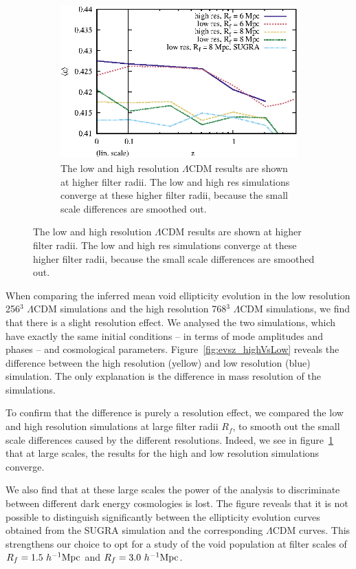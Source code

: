 \begin{figure}
\begin{subfigure}[t]{0.49\textwidth}
    \includegraphics[width=\textwidth]{ch_voidsde/img/filter_radius_convergence}
    \caption{The low and high resolution $\Lambda$CDM results are shown at higher filter radii. The low and high res simulations converge at these higher filter radii, because the small scale differences are smoothed out.}
    \label{fig:filter_radius_convergence}
  \end{subfigure}
\label{fig:evsz}
\end{figure}

When comparing the inferred mean void ellipticity evolution in the low resolution 256$^3$ $\Lambda$CDM simulations and the 
high resolution 768$^3$ $\Lambda$CDM simulations, we find that there is a slight resolution effect. We analysed the two 
simulations, which have exactly the same initial conditions -- in terms of mode amplitudes and phases -- and cosmological 
parameters. Figure~\ref{fig:evsz_highVsLow} reveals the difference between the high resolution (yellow) and 
low resolution (blue) simulation. The only explanation is the difference in mass resolution of the simulations.

To confirm that the difference is purely a resolution effect, we compared the low and high resolution simulations at 
large filter radii $R_f$, to smooth out the small scale differences caused by the different resolutions. Indeed, we 
see in figure~\ref{fig:filter_radius_convergence} that at large scales, the results for the high and low resolution 
simulations converge.

We also find that at these large scales the power of the analysis to discriminate between different dark energy 
cosmologies is lost. The figure reveals that it is not possible to distinguish significantly between 
the ellipticity evolution curves obtained from the SUGRA simulation and the corresponding $\Lambda$CDM curves. 
This strengthens our choice to opt for a study of the void population at filter scales of $R_f=1.5~h^{-1} {\rm Mpc}$ and 
$R_f=3.0~h^{-1} {\rm Mpc}$. 

